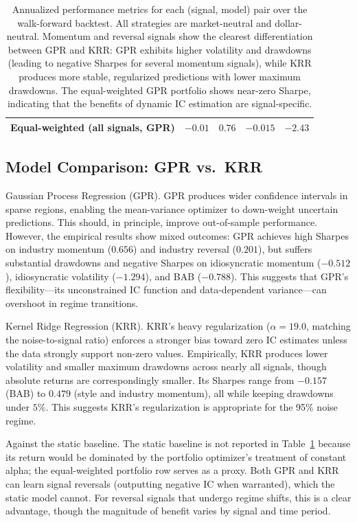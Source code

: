\documentclass[11pt]{amsart}
\begin{document}
\begin{table}[htp]
\begin{tabular}{lcccc}
    \midrule
    Equal-weighted (all signals, GPR) & $-0.01$ & $0.76$   & $-0.015$ & $-2.43$   \\
    \bottomrule
  \end{tabular}
  \caption[Strategy Performance 2010--2024]{
    Annualized performance metrics for each (signal, model) pair over the
    walk-forward backtest. All strategies are market-neutral and
    dollar-neutral. Momentum and reversal signals show the clearest
    differentiation between GPR and KRR: GPR exhibits higher volatility
    and drawdowns (leading to negative Sharpes for several momentum signals),
    while KRR produces more stable, regularized predictions with lower
    maximum drawdowns. The equal-weighted GPR portfolio shows near-zero Sharpe,
    indicating that the benefits of dynamic IC estimation are signal-specific.
  }
  \label{tbl:perf}
\end{table}

\subsection{Model Comparison: GPR vs.\ KRR}

Gaussian Process Regression (GPR).
GPR produces wider confidence intervals in sparse regions, enabling the
mean-variance optimizer to down-weight uncertain predictions. This should, in
principle, improve out-of-sample performance. However, the empirical results
show mixed outcomes: GPR achieves high Sharpes on industry momentum ($0.656$)
and industry reversal ($0.201$), but suffers substantial drawdowns and negative
Sharpes on idiosyncratic momentum ($-0.512$), idiosyncratic volatility
($-1.294$), and BAB ($-0.788$). This suggests that GPR's flexibility---its
unconstrained IC function and data-dependent variance---can overshoot in
regime transitions.

Kernel Ridge Regression (KRR).
KRR's heavy regularization ($\alpha = 19.0$, matching the noise-to-signal ratio)
enforces a stronger bias toward zero IC estimates unless the data strongly
support non-zero values. Empirically, KRR produces lower volatility and smaller
maximum drawdowns across nearly all signals, though absolute returns are
correspondingly smaller. Its Sharpes range from $-0.157$ (BAB) to $0.479$
(style and industry momentum), all while keeping drawdowns under $5\%$. This
suggests KRR's regularization is appropriate for the 95\% noise regime.

Against the static baseline.
The static baseline is not reported in Table~\ref{tbl:perf} because its
return would be dominated by the portfolio optimizer's treatment of constant
alpha; the equal-weighted portfolio row serves as a proxy. Both GPR and KRR
can learn signal reversals (outputting negative IC when warranted), which the
static model cannot. For reversal signals that undergo regime shifts, this is
a clear advantage, though the magnitude of benefit varies by signal and
time period.
\end{document}
